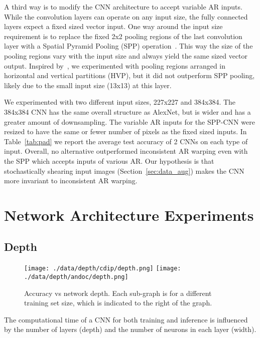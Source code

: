 \documentclass[10pt, conference, compsocconf]{IEEEtran}
\newcommand{\squeezeup}{\vspace{-2.5mm}}
\begin{document}
A third way is to modify the CNN architecture to accept variable AR inputs.
While the convolution layers can operate on any input size, the fully connected layers expect a fixed sized vector input.
One way around the input size requirement is to replace the fixed 2x2 pooling regions of the last convolution layer with a Spatial Pyramid Pooling (SPP) operation~\cite{he15spatial}.
This way the size of the pooling regions vary with the input size and always yield the same sized vector output.
Inspired by~\cite{kumar13}, we experimented with pooling regions arranged in horizontal and vertical partitions (HVP), but it did not outperform SPP pooling, likely due to the small input size (13x13) at this layer.

We experimented with two different input sizes, 227x227 and 384x384.
The 384x384 CNN has the same overall structure as AlexNet, but is wider and has a greater amount of downsampling.
The variable AR inputs for the SPP-CNN were resized to have the same or fewer number of pixels as the fixed sized inputs.
In Table~\ref{tab:pad} we report the average test accuracy of 2 CNNs on each type of input.
Overall, no alternative outperformed inconsistent AR warping even with the SPP which accepts inputs of various AR.
Our hypothesis is that stochastically shearing input images (Section~\ref{sec:data_aug}) makes the CNN more invariant to inconsistent AR warping.

\section{Network Architecture Experiments}

\subsection{Depth}

\begin{figure}

\texttt{[image: ./data/depth/cdip/depth.png]}
\texttt{[image: ./data/depth/andoc/depth.png]}

\caption{Accuracy vs network depth.  Each sub-graph is for a different training set size, which is indicated to the right of the graph.}
\label{fig:depth}
\squeezeup
\end{figure}

The computational time of a CNN for both training and inference is influenced by the number of layers (depth) and the number of neurons in each layer (width).
\end{document}
